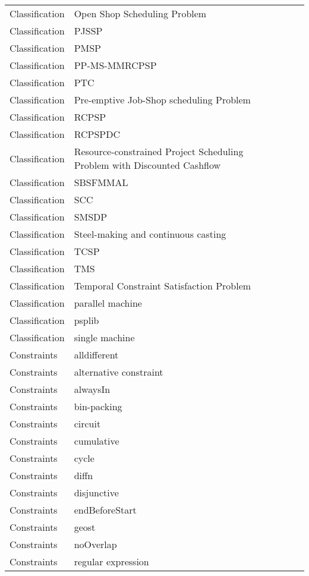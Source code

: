 {\begin{longtable}{lp{3cm}>{\raggedright}p{6cm}>{\raggedright}p{6cm}p{8cm}}
Classification & Open Shop Scheduling Problem &  &  & \\
Classification & PJSSP &  &  & \\
Classification & PMSP &  &  & \\
Classification & PP-MS-MMRCPSP &  &  & \\
Classification & PTC &  &  & \\
Classification & Pre-emptive Job-Shop scheduling Problem &  &  & \\
Classification & RCPSP &  &  & \\
Classification & RCPSPDC &  &  & \\
Classification & Resource-constrained Project Scheduling Problem with Discounted Cashflow &  &  & \\
Classification & SBSFMMAL &  &  & \\
Classification & SCC &  &  & \\
Classification & SMSDP &  &  & \\
Classification & Steel-making and continuous casting &  &  & \\
Classification & TCSP &  &  & \\
Classification & TMS &  &  & \\
Classification & Temporal Constraint Satisfaction Problem &  &  & \\
Classification & parallel machine &  &  & \\
Classification & psplib &  &  & \\
Classification & single machine &  &  & \\
Constraints & alldifferent &  &  & \\
Constraints & alternative constraint &  &  & \\
Constraints & alwaysIn &  &  & \\
Constraints & bin-packing &  &  & \\
Constraints & circuit &  &  & \\
Constraints & cumulative &  &  & \\
Constraints & cycle &  &  & \\
Constraints & diffn &  &  & \\
Constraints & disjunctive &  &  & \\
Constraints & endBeforeStart &  &  & \\
Constraints & geost &  &  & \\
Constraints & noOverlap &  &  & \\
Constraints & regular expression &  &  & \\

\end{longtable}}
